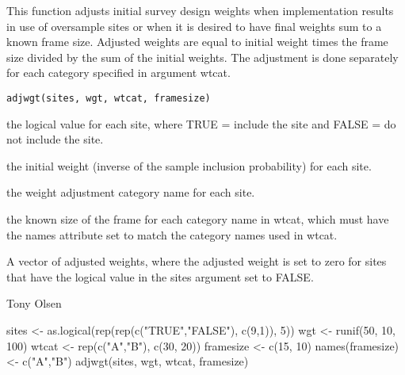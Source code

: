 \begin{Description}\relax
This function adjusts initial survey design weights when implementation results
in use of oversample sites or when it is desired to have final weights sum to a
known frame size.  Adjusted weights are equal to initial weight times the frame
size divided by the sum of the initial weights.  The adjustment is done 
separately for each category specified in argument wtcat.
\end{Description}
\begin{Usage}
\begin{verbatim}
adjwgt(sites, wgt, wtcat, framesize)
\end{verbatim}
\end{Usage}
\begin{Arguments}
\begin{ldescription}
\item[\code{sites}] the logical value for each site, where TRUE = include the site
and FALSE = do not include the site.
\item[\code{wgt}] the initial weight (inverse of the sample inclusion probability)
for each site.
\item[\code{wtcat}] the weight adjustment category name for each site.
\item[\code{framesize}] the known size of the frame for each category name in 
wtcat, which must have the names attribute set to match the category 
names used in wtcat.
\end{ldescription}
\end{Arguments}
\begin{Value}
A vector of adjusted weights, where the adjusted weight is set to zero for 
sites that have the logical value in the sites argument set to FALSE.
\end{Value}
\begin{Author}\relax
Tony Olsen 
\end{Author}
\begin{Examples}
\begin{ExampleCode}
sites <- as.logical(rep(rep(c("TRUE","FALSE"), c(9,1)), 5))
wgt <- runif(50, 10, 100)
wtcat <- rep(c("A","B"), c(30, 20))
framesize <- c(15, 10)
names(framesize) <- c("A","B")
adjwgt(sites, wgt, wtcat, framesize)
\end{ExampleCode}
\end{Examples}

